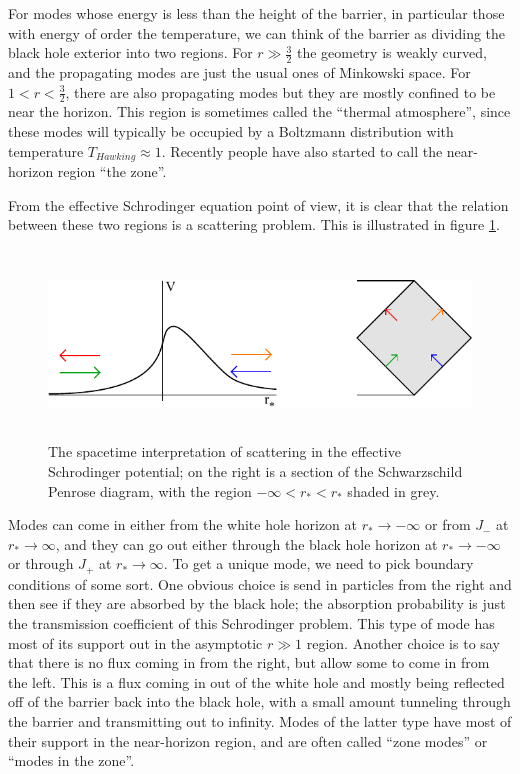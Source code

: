\documentclass[12pt]{article}
\begin{document}
For modes whose energy is less than the height of the barrier, in particular those with energy of order the temperature, we can think of the barrier as dividing the black hole exterior into two regions.  For $r\gg \frac{3}{2}$ the geometry is weakly curved, and the propagating modes are just the usual ones of Minkowski space.  For $1<r<\frac{3}{2}$, there are also propagating modes but they are mostly confined to be near the horizon.  This region is sometimes called the ``thermal atmosphere'', since these modes will typically be occupied by a Boltzmann distribution with temperature $T_{Hawking}\approx 1$.  Recently people have also started to call the near-horizon region ``the zone''.  

From the effective Schrodinger equation point of view, it is clear that the relation between these two regions is a scattering problem. This is illustrated in figure \ref{schscat}.
\begin{figure}
\begin{center}
\includegraphics[height=5cm]{schscat.pdf}
\caption{The spacetime interpretation of scattering in the effective Schrodinger potential; on the right is a section of the Schwarzschild Penrose diagram, with the region $-\infty<r_*<r_*$ shaded in grey.}\label{schscat}
\end{center}
\end{figure}
Modes can come in either from the white hole horizon at $r_*\to -\infty$ or from $J_-$ at $r_*\to \infty$, and they can go out either through the black hole horizon at $r_*\to -\infty$ or through $J_+$ at $r_* \to \infty$.  To get a unique mode, we need to pick boundary conditions of some sort.  One obvious choice is send in particles from the right and then see if they are absorbed by the black hole; the absorption probability is just the transmission coefficient of this Schrodinger problem.  This type of mode has most of its support out in the asymptotic $r\gg 1$ region.  Another choice is to say that there is no flux coming in from the right, but allow some to come in from the left. This is a flux coming in out of the white hole and mostly being reflected off of the barrier back into the black hole, with a small amount tunneling through the barrier and transmitting out to infinity.  Modes of the latter type have most of their support in the near-horizon region, and are often called ``zone modes'' or ``modes in the zone''.  
\end{document}
